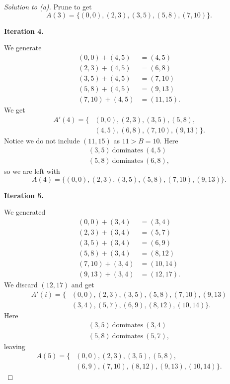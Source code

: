 \documentclass[11pt]{article}
\begin{document}
\begin{proof}[Solution to (a)]
    Prune to get 
    \[
        A(3)=\{(0,0),(2,3),(3,5),(5,8),(7,10)\}.
    \]

    \textbf{Iteration 4.}

    We generate 
    \[
        \begin{aligned}
            (0,0) + (4,5) &= (4,5) \\  
            (2,3) + (4,5) &= (6,8) \\  
            (3,5) + (4,5) &= (7,10) \\  
            (5,8) + (4,5) &= (9,13) \\  
            (7,10) + (4,5) &= (11,15).  
        \end{aligned}
    \]
    We get 
    \[
        \begin{aligned}
            A'(4) 
            = \{&(0,0), (2,3), (3,5), (5,8), \\ 
            &  (4,5), (6,8), (7,10), (9,13)\}. 
        \end{aligned}
    \]
    Notice we do not include $(11,15)$ as $11 > B = 10$. 
    Here 
    \[
        \begin{aligned}
            (3,5) \ \text{dominates} \ (4,5) \\ 
            (5,8) \ \text{dominates} \ (6,8), 
        \end{aligned}
    \]
    so we are left with 
    \[
        A(4) = \{(0,0), (2,3), (3,5), (5,8), (7,10), (9,13)\}. 
    \]

    \textbf{Iteration 5.}

    We generated 
    \[  
        \begin{aligned}
            (0,0) + (3,4) &= (3,4) \\ 
            (2,3) + (3,4) &= (5,7) \\ 
            (3,5) + (3,4) &= (6,9) \\ 
            (5,8) + (3,4) &= (8,12) \\ 
            (7,10) + (3,4) &= (10,14) \\ 
            (9,13) + (3,4) &= (12,17).  
        \end{aligned}
    \]
    We discard $(12,17)$ and get 
    \[
        \begin{aligned}
            A'(i) = \{&(0,0), (2,3), (3,5), (5,8), (7,10), 
            (9,13) \\ 
            &(3,4), (5,7), (6,9), (8,12), (10,14)\}. 
        \end{aligned}
    \]
    Here 
    \[
        \begin{aligned}
            (3,5) \ \text{dominates} \ (3,4) \\
            (5,8) \ \text{dominates} \ (5,7), 
        \end{aligned}
    \]
    leaving 
    \[
        \begin{aligned}
        A(5)=\{&
        (0,0),(2,3),(3,5),(5,8),\\
        &(6,9),(7,10),(8,12),(9,13),(10,14)\}.
        \end{aligned}
    \]


\end{proof}
\end{document}
